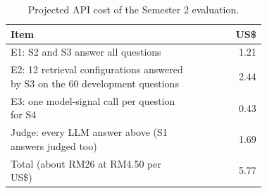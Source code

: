 \documentclass[12pt,nonacm,acmlarge,titlepage,screen]{acmart}
\begin{document}
\begin{table}[H]
\caption{Projected API cost of the Semester 2 evaluation.}
\label{tab:cost}
\small
\begin{tabular}{L{0.72\linewidth}r}
\toprule
Item & US\$ \\
\midrule
E1: S2 and S3 answer all questions & 1.21 \\
E2: 12 retrieval configurations answered by S3 on the 60 development questions & 2.44 \\
E3: one model-signal call per question for S4 & 0.43 \\
Judge: every LLM answer above (S1 answers judged too) & 1.69 \\
\midrule
Total (about RM26 at RM4.50 per US\$) & 5.77 \\
\bottomrule
\end{tabular}
\end{table}
\end{document}
